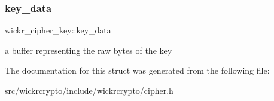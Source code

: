 \subsubsection{\texorpdfstring{key\+\_\+data}{key\_data}}
{\footnotesize\ttfamily wickr\+\_\+cipher\+\_\+key\+::key\+\_\+data}

a buffer representing the raw bytes of the key 

The documentation for this struct was generated from the following file\+:\begin{DoxyCompactItemize}
\item 
src/wickrcrypto/include/wickrcrypto/cipher.\+h\end{DoxyCompactItemize}
